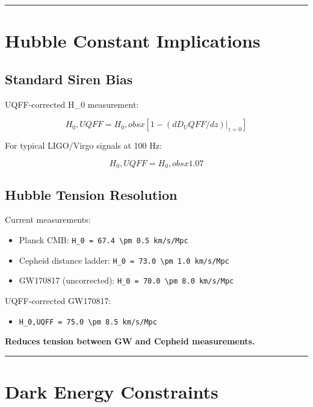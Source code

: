 \documentclass[12pt,a4paper]{article}
\begin{document}
\medskip\hrule\medskip

\section{Hubble Constant Implications}

\subsection{Standard Siren Bias}

UQFF-corrected H\_0 measurement:

\begin{equation}
H_0,UQFF = H_0,obs x [1 - (dD_UQFF/dz)|_{z=0}]
\end{equation}

For typical LIGO/Virgo signals at 100 Hz:

\begin{equation}
H_0,UQFF = H_0,obs x 1.07
\end{equation}

\subsection{Hubble Tension Resolution}

Current measurements:

\begin{itemize}
  \item Planck CMB: \texttt{H\_0 = 67.4 \textbackslash pm 0.5 km/s/Mpc}
  \item Cepheid distance ladder: \texttt{H\_0 = 73.0 \textbackslash pm 1.0 km/s/Mpc}
  \item GW170817 (uncorrected): \texttt{H\_0 = 70.0 \textbackslash pm 8.0 km/s/Mpc}
\end{itemize}

UQFF-corrected GW170817:

\begin{itemize}
  \item \texttt{H\_0,UQFF = 75.0 \textbackslash pm 8.5 km/s/Mpc}
\end{itemize}

\textbf{Reduces tension between GW and Cepheid measurements.}

\medskip\hrule\medskip

\section{Dark Energy Constraints}
\end{document}
